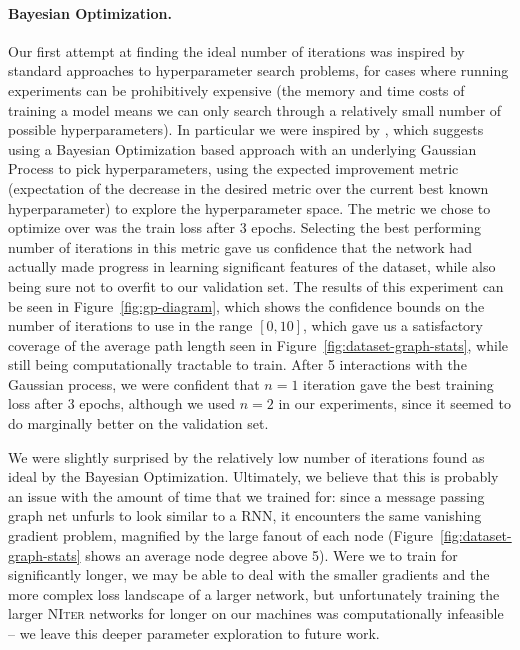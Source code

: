\paragraph{Bayesian Optimization.}
Our first attempt at finding the ideal number of iterations was inspired by standard approaches to hyperparameter search problems, for cases where running experiments can be prohibitively expensive (the memory and time costs of training a model means we can only search through a relatively small number of possible hyperparameters).
In particular we were inspired by \cite{snoek2012practical}, which suggests using a Bayesian Optimization based approach with an underlying Gaussian Process to pick hyperparameters, using the expected improvement metric (expectation of the decrease in the desired metric over the current best known hyperparameter) to explore the hyperparameter space.
The metric we chose to optimize over was the train loss after 3 epochs.
Selecting the best performing number of iterations in this metric gave us confidence that the network had actually made progress in learning significant features of the dataset, while also being sure not to overfit to our validation set.
The results of this experiment can be seen in Figure~\ref{fig:gp-diagram}, which shows the confidence bounds on the number of iterations to use in the range $[0, 10]$, which gave us a satisfactory coverage of the average path length seen in Figure~\ref{fig:dataset-graph-stats}, while still being computationally tractable to train.
After 5 interactions with the Gaussian process, we were confident that $n=1$ iteration gave the best training loss after 3 epochs, although we used $n=2$ in our experiments, since it seemed to do marginally better on the validation set.

We were slightly surprised by the relatively low number of iterations found as ideal by the Bayesian Optimization.
Ultimately, we believe that this is probably an issue with the amount of time that we trained for: since a message passing graph net unfurls to look similar to a RNN, it encounters the same vanishing gradient problem, magnified by the large fanout of each node (Figure~\ref{fig:dataset-graph-stats} shows an average node degree above 5).
Were we to train for significantly longer, we may be able to deal with the smaller gradients and the more complex loss landscape of a larger network, but unfortunately training the larger \textsc{NIter} networks for longer on our machines was computationally infeasible -- we leave this deeper parameter exploration to future work.

